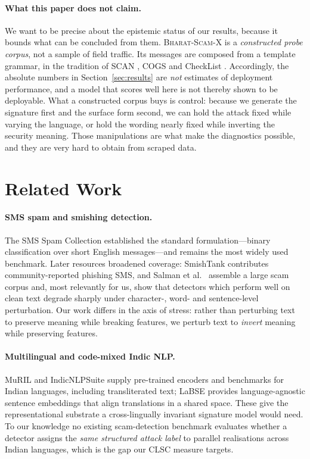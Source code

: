 \documentclass[11pt,a4paper]{article}
\newcommand{\bsx}{\textsc{Bharat-Scam-X}}
\begin{document}
\paragraph{What this paper does not claim.}
We want to be precise about the epistemic status of our results, because it
bounds what can be concluded from them. \bsx{} is a \emph{constructed probe
corpus}, not a sample of field traffic. Its messages are composed from a
template grammar, in the tradition of SCAN \cite{lake2018scan}, COGS
\cite{kim2020cogs} and CheckList \cite{ribeiro2020checklist}. Accordingly, the
absolute numbers in Section~\ref{sec:results} are \emph{not} estimates of
deployment performance, and a model that scores well here is not thereby shown
to be deployable. What a constructed corpus buys is control: because we generate
the signature first and the surface form second, we can hold the attack fixed
while varying the language, or hold the wording nearly fixed while inverting the
security meaning. Those manipulations are what make the diagnostics possible,
and they are very hard to obtain from scraped data.

\section{Related Work}

\paragraph{SMS spam and smishing detection.}
The SMS Spam Collection \cite{almeida2011sms} established the standard
formulation---binary classification over short English messages---and remains
the most widely used benchmark. Later resources broadened coverage: SmishTank
\cite{timko2024smishtank} contributes community-reported phishing SMS, and
Salman et al.\ \cite{salman2022empirical} assemble a large scam corpus and, most
relevantly for us, show that detectors which perform well on clean text degrade
sharply under character-, word- and sentence-level perturbation. Our work
differs in the axis of stress: rather than perturbing text to preserve meaning
while breaking features, we perturb text to \emph{invert} meaning while
preserving features.

\paragraph{Multilingual and code-mixed Indic NLP.}
MuRIL \cite{khanuja2021muril} and IndicNLPSuite \cite{kakwani2020indicnlpsuite}
supply pre-trained encoders and benchmarks for Indian languages, including
transliterated text; LaBSE \cite{feng2022labse} provides language-agnostic
sentence embeddings that align translations in a shared space. These give the
representational substrate a cross-lingually invariant signature model would
need. To our knowledge no existing scam-detection benchmark evaluates whether a
detector assigns the \emph{same structured attack label} to parallel
realisations across Indian languages, which is the gap our CLSC measure targets.
\end{document}
